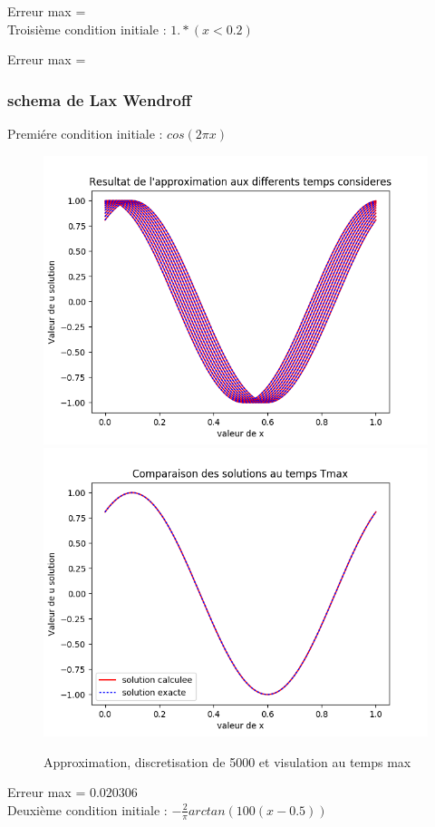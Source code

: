 \documentclass[12pt]{article}
\begin{document}
Erreur max =
\\Troisième condition initiale : $1.*(x<0.2)$

Erreur max = 

\subsubsection{schema de Lax Wendroff}
Premiére condition initiale : $cos(2 \pi x)$

 \begin{figure}[H]
	\centering
	\includegraphics[scale=0.45]{1D_c1_5000.png}
	\includegraphics[scale=0.45]{Temp_max_c1_5000.png}
	\caption{Approximation, discretisation de 5000 et visulation au temps max}
	\label{1D} 
	\end{figure}
Erreur max = $0.020306$
\\Deuxième condition initiale : $-\frac{2}{\pi}arctan(100(x-0.5))$
\end{document}
